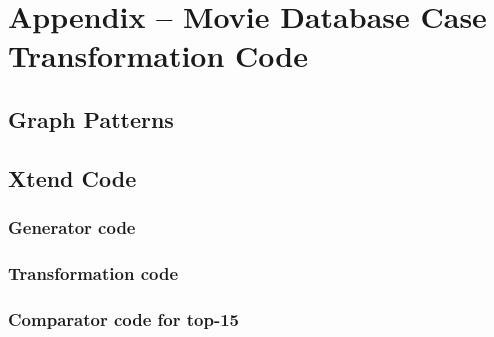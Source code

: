 \section{Appendix -- Movie Database Case Transformation Code}
\label{app:xform}

\subsection{\incquery{} Graph Patterns}
\label{app:pattern}



\subsection{Xtend Code}

\subsubsection{Generator code}
\label{app:xtend:task1}


\subsubsection{Transformation code}
\label{app:xtend:xform}

\subsubsection{Comparator code for top-15}
\label{app:xtend:comparator}

